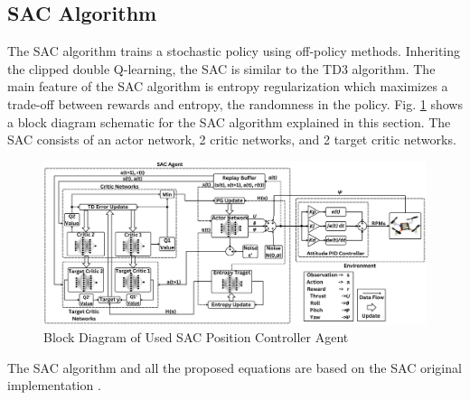     \subsection{SAC Algorithm}
    The SAC algorithm trains a stochastic policy using off-policy methods. Inheriting the clipped double Q-learning, the SAC is similar to the TD3 algorithm. The main feature of the SAC algorithm is entropy regularization which maximizes a trade-off between rewards and entropy, the randomness in the policy. Fig. \ref{SAC Block Diagram} shows a block diagram schematic for the SAC algorithm explained in this section. The SAC consists of an actor network, 2 critic networks, and 2 target critic networks.
    \begin{figure}[H]
            \centering
            \includegraphics[width=1\linewidth]{Images/SAC.png}
            \caption{Block Diagram of Used SAC Position Controller Agent}
            \label{SAC Block Diagram}
    \end{figure}
    The SAC algorithm and all the proposed equations are based on the SAC original implementation \cite{haarnoja2019soft} \cite{haarnoja2018soft} \cite{haarnoja2019learning}.
